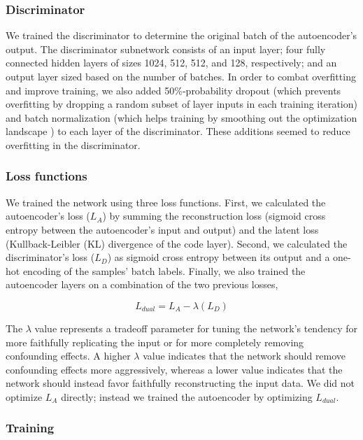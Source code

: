 \documentclass[12pt]{article}
\begin{document}
\subsubsection{Discriminator}

We trained the discriminator to determine the original batch of the autoencoder's output.
The discriminator subnetwork consists of an input layer; four fully connected hidden layers of sizes 1024, 512, 512, and 128, respectively; and an output layer sized based on the number of batches.
In order to combat overfitting and improve training, we also added 50\%-probability dropout \cite{srivastava_dropout_2014} (which prevents overfitting by dropping a random subset of layer inputs in each training iteration) and batch normalization \cite{ioffe_batch_2015} (which helps training by smoothing out the optimization landscape \citep{santurkar_how_2018}) to each layer of the discriminator.
These additions seemed to reduce overfitting in the discriminator.

\subsubsection{Loss functions}

We trained the network using three loss functions.
First, we calculated the autoencoder's loss ($L_A$) by summing the reconstruction loss (sigmoid cross entropy between the autoencoder's input and output) and the latent loss (Kullback-Leibler (KL) divergence \cite{kullback_information_1951} of the code layer).
Second, we calculated the discriminator's loss ($L_D$) as sigmoid cross entropy between its output and a one-hot encoding of the samples' batch labels.
Finally, we also trained the autoencoder layers on a combination of the two previous losses,

\begin{equation}
	\label{dual_loss}
	L_{dual} = L_A - \lambda{}(L_D)
\end{equation}

The $\lambda$ value represents a tradeoff parameter for tuning the network's tendency for more faithfully replicating the input or for more completely removing confounding effects.
A higher $\lambda$ value indicates that the network should remove confounding effects more aggressively, whereas a lower value indicates that the network should instead favor faithfully reconstructing the input data.
We did not optimize $L_A$ directly; instead we trained the autoencoder by optimizing $L_{dual}$.

\subsubsection{Training}
\end{document}
